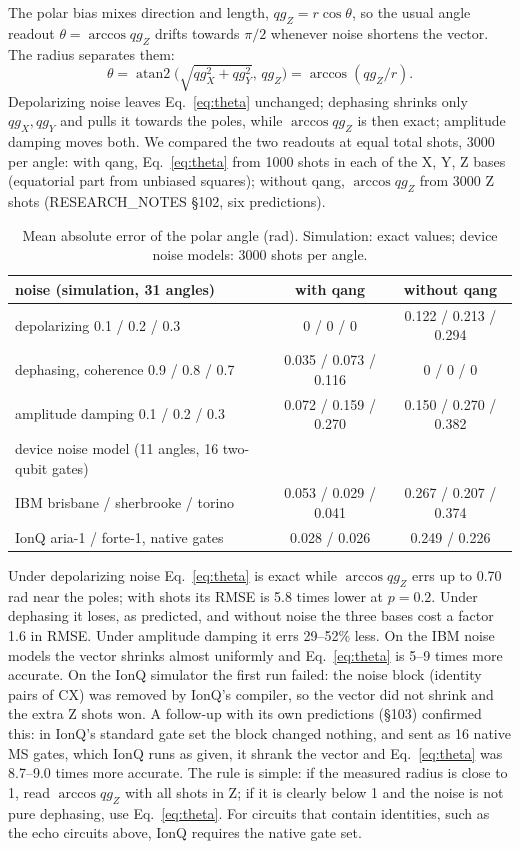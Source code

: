 \documentclass[11pt]{article}
\newcommand{\qZ}{qg_Z}
\newcommand{\qX}{qg_X}
\newcommand{\qY}{qg_Y}
\begin{document}
The polar bias mixes direction and length, $\qZ=r\cos\theta$, so the usual angle readout
$\theta=\arccos\qZ$ drifts towards $\pi/2$ whenever noise shortens the vector. The radius separates them:
\begin{equation}\label{eq:theta}
\theta=\operatorname{atan2}\!\big(\sqrt{\qX^2+\qY^2},\,\qZ\big)=\arccos(\qZ/r).
\end{equation}
Depolarizing noise leaves Eq.~\eqref{eq:theta} unchanged; dephasing shrinks only $\qX,\qY$ and pulls it towards the
poles, while $\arccos\qZ$ is then exact; amplitude damping moves both. We compared the two readouts at equal total
shots, 3000 per angle: with qang, Eq.~\eqref{eq:theta} from 1000 shots in each of the X, Y, Z bases (equatorial part from
unbiased squares); without qang, $\arccos\qZ$ from 3000 Z shots (RESEARCH\_NOTES \S102, six predictions).

\begin{table}[h]
\centering\small
\begin{tabular}{lcc}
\toprule
noise (simulation, 31 angles) & with qang & without qang \\
\midrule
depolarizing 0.1 / 0.2 / 0.3 & 0 / 0 / 0 & 0.122 / 0.213 / 0.294 \\
dephasing, coherence 0.9 / 0.8 / 0.7 & 0.035 / 0.073 / 0.116 & 0 / 0 / 0 \\
amplitude damping 0.1 / 0.2 / 0.3 & 0.072 / 0.159 / 0.270 & 0.150 / 0.270 / 0.382 \\
\midrule
device noise model (11 angles, 16 two-qubit gates) & & \\
IBM brisbane / sherbrooke / torino & 0.053 / 0.029 / 0.041 & 0.267 / 0.207 / 0.374 \\
IonQ aria-1 / forte-1, native gates & 0.028 / 0.026 & 0.249 / 0.226 \\
\bottomrule
\end{tabular}
\caption{Mean absolute error of the polar angle (rad). Simulation: exact values; device noise models: 3000 shots per
angle.}
\label{tab:theta}
\end{table}

Under depolarizing noise Eq.~\eqref{eq:theta} is exact while $\arccos\qZ$ errs up to 0.70 rad near the poles; with shots
its RMSE is 5.8 times lower at $p=0.2$. Under dephasing it loses, as predicted, and without noise the three bases cost
a factor 1.6 in RMSE. Under amplitude damping it errs 29--52\% less. On the IBM noise models the vector shrinks almost
uniformly and Eq.~\eqref{eq:theta} is 5--9 times more accurate. On the IonQ simulator the first run failed: the noise
block (identity pairs of CX) was removed by IonQ's compiler, so the vector did not shrink and the extra Z shots won.
A follow-up with its own predictions (\S103) confirmed this: in IonQ's standard gate set the block changed nothing,
and sent as 16 native MS gates, which IonQ runs as given, it shrank the vector and Eq.~\eqref{eq:theta} was 8.7--9.0
times more accurate. The rule is simple: if the measured radius is close to 1, read $\arccos\qZ$ with all shots in Z;
if it is clearly below 1 and the noise is not pure dephasing, use Eq.~\eqref{eq:theta}. For circuits that contain
identities, such as the echo circuits above, IonQ requires the native gate set.
\end{document}
